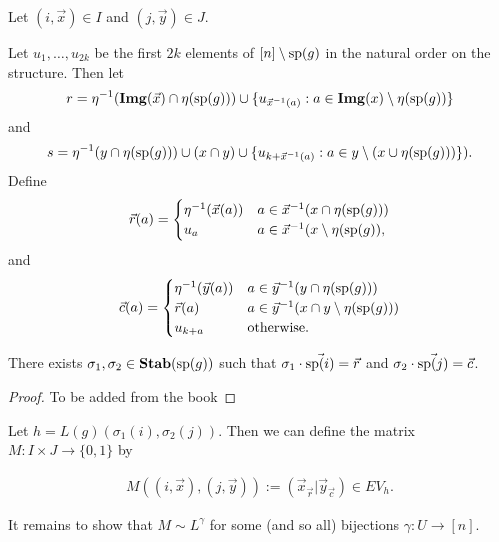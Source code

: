 \documentclass[../paper.tex]{subfiles}
\begin{document}
Let $(i, \vec{x}) \in I$ and $(j, \vec{y}) \in J$.

Let $u_1 , \ldots , u_{2k}$ be the first $2k$ elements of $[n] \setminus
\text{sp}(g)$ in the natural order on the structure. Then let
\[r = \eta^{-1} (\text{\textbf{Img}}(\vec{x}) \cap \eta (\text{sp}(g))) \cup
  \{u_{\vec{x}^{-1}(a)}: a \in \text{\textbf{Img}}(x) \setminus \eta (\text{sp} (g))\} \] and
\[s = \eta^{-1} (y \cap \eta (\text{sp}(g))) \cup (x \cap y) \cup \{ u_{k +
    \vec{x}^{-1}(a)} : a \in y \setminus (x \cup \eta (\text{sp} (g))) \}). \]
Define
\[
  \vec{r} (a) =
  \begin{cases}
    \eta^{-1} (\vec{x} (a)) & a \in \vec{x}^{-1} (x \cap \eta (\text{sp}(g))) \\
    u_{a} & a \in \vec{x}^{-1} (x \setminus \eta(\text{sp}(g)),
  \end{cases}
\]
and
\[
  \vec{c} (a) =
  \begin{cases}
    \eta^{-1} (\vec{y} (a)) & a \in \vec{y}^{-1}(y \cap \eta (\text{sp} (g))) \\
    \vec{r} (a) & a \in \vec{y}^{-1} (x \cap y \setminus \eta (\text{sp} (g))) \\
    u_{k+a} & \text{otherwise}.
  \end{cases}
\]

\begin{lem}
  \label{lem:permutation_row-column}
  There exists $\sigma_1, \sigma_2 \in \text{\textbf{Stab}} (\text{sp} (g))$ such that $\sigma_1 \cdot
  \vec{\text{sp}(i)} = \vec{r}$ and $\sigma_2 \cdot \vec{\text{sp}(j)} = \vec{c}$.
\end{lem}
\begin{proof}
  To be added from the book
\end{proof}

Let $h = L(g)(\sigma_1(i), \sigma_2 (j))$. Then we can define the matrix $M : I
\times J \rightarrow \{0,1\}$ by

\begin{align*}
  M((i , \vec{x}), (j, \vec{y})) := (\vec{x}_{\vec{r}} \vert \vec{y}_{\vec{c}}) \in EV_h.
\end{align*}

It remains to show that $M \sim L^{\gamma}$ for some (and so all) bijections
$\gamma: U \rightarrow [n]$.
\end{document}

